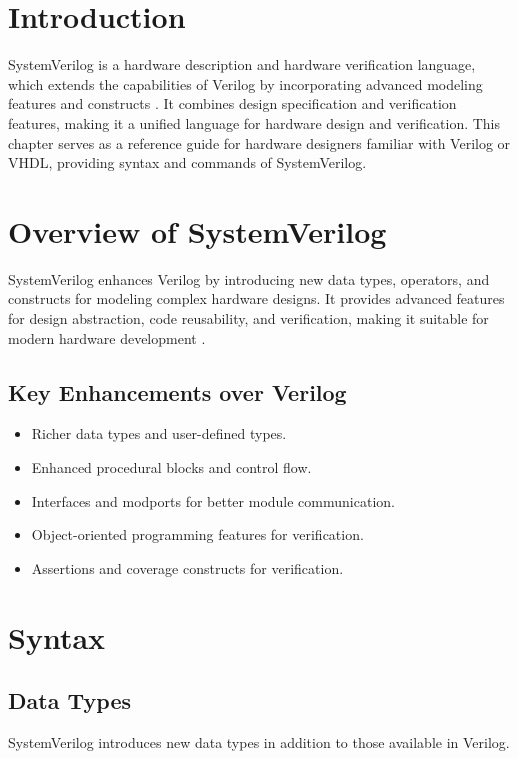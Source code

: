 \section{Introduction}
SystemVerilog is a hardware description and hardware verification language, which extends the capabilities of Verilog by incorporating advanced modeling features and constructs \cite{ieee1800-2017}. It combines design specification and verification features, making it a unified language for hardware design and verification. This chapter serves as a reference guide for hardware designers familiar with Verilog or VHDL, providing syntax and commands of SystemVerilog.

\section{Overview of SystemVerilog}
SystemVerilog enhances Verilog by introducing new data types, operators, and constructs for modeling complex hardware designs. It provides advanced features for design abstraction, code reusability, and verification, making it suitable for modern hardware development \cite{baker2010systemverilog}.

\subsection{Key Enhancements over Verilog}
\begin{itemize}
    \item Richer data types and user-defined types.
    \item Enhanced procedural blocks and control flow.
    \item Interfaces and modports for better module communication.
    \item Object-oriented programming features for verification.
    \item Assertions and coverage constructs for verification.
\end{itemize}

\section{Syntax}

\subsection{Data Types}
SystemVerilog introduces new data types in addition to those available in Verilog.

